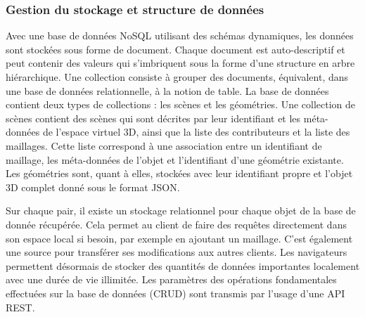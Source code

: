 \subsubsection{Gestion du stockage et structure de données}

Avec une base de données NoSQL utilisant des schémas dynamiques, les 
données sont stockées sous forme de document. Chaque document est 
auto-descriptif et peut contenir des valeurs qui s'imbriquent sous la forme d'une 
structure en arbre hiérarchique. Une collection consiste à grouper des documents, 
équivalent, dans une base de données relationnelle, à la notion de table. La base de 
données contient deux types de collections : les scènes et les géométries. Une 
collection de scènes contient des scènes qui sont décrites par leur identifiant et 
les méta-données de l'espace virtuel \gls{3D}, ainsi que la liste des contributeurs et 
la 
liste des maillages. Cette liste correspond à une association entre un identifiant de 
maillage, les méta-données de l'objet et l'identifiant d'une géométrie existante. 
Les géométries sont, quant à elles, stockées avec leur identifiant propre et l'objet 
3D complet donné sous le format \gls{JSON}.

Sur chaque pair, il existe un stockage relationnel pour 
chaque objet de la base de donnée récupérée. Cela permet au client de faire des 
requêtes directement dans son espace local si besoin, par exemple en ajoutant un maillage. 
C'est également une source pour transférer ses modifications aux autres clients.
Les navigateurs permettent désormais de stocker des quantités de données 
importantes localement avec une durée de vie illimitée. 
Les paramètres des opérations fondamentales effectuées sur la base de données 
(\gls{CRUD}) sont transmis par l'usage d'une \gls{API}
\gls{REST}.



%
%
%
%
%

